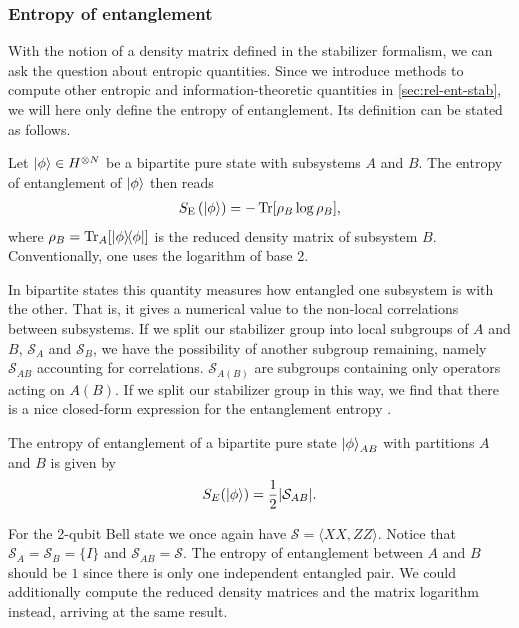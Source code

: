 \subsubsection{Entropy of entanglement}

With the notion of a density matrix defined in the stabilizer formalism, we can
ask the question about entropic quantities. Since we introduce methods to
compute other entropic and information-theoretic quantities in
\cref{sec:rel-ent-stab}, we will here only define the entropy of entanglement.
Its definition can be stated as follows.
\begin{defn}\label{defn:entent}
  Let $\ket{\phi}\in H^{\otimes N}$ be a bipartite pure state with subsystems
  $A$ and $B$. The entropy of entanglement of $\ket{\phi}$ then reads
  \begin{align}
    S_\mathrm{E}\left(\ket{\phi}\right) = - \Tr[\rho_B \log \rho_B],
  \end{align}
  where $\rho_B = \Tr_A[\dyad{\phi}]$ is the reduced density matrix of subsystem
  $B$. Conventionally, one uses the logarithm of base 2.
\end{defn}

In bipartite states this quantity measures how entangled one subsystem is with
the other. That is, it gives a numerical value to the non-local correlations between
subsystems. If we split our stabilizer group into local subgroups of $A$ and
$B$, $\mathcal{S}_A$ and $\mathcal{S}_B$, we have the possibility of another
subgroup remaining, namely $\mathcal{S}_{AB}$ accounting for correlations.
$\mathcal{S}_{A(B)}$ are subgroups containing only operators acting on $A (B)$.
If we split our stabilizer group in this way, we find that there is a nice
closed-form expression for the entanglement entropy
\cite{fattalEntanglementStabilizerFormalism2004}.

\begin{thm}\label{thm:entent}
  The entropy of entanglement of a bipartite pure state $\ket{\phi}_{AB}$ with
  partitions $A$ and $B$ is given
  by
  \begin{align}\label{eq:entent}
    S_E(\ket{\phi}) = \frac{1}{2}\abs{\mathcal{S}_{AB}}
  .\end{align}
\end{thm}
For
the 2-qubit Bell state we once again have $\mathcal{S} = \langle XX,
ZZ\rangle$. Notice that $\mathcal{S}_A = \mathcal{S}_B = \{I\}$ and $\mathcal{S}_{AB} =
\mathcal{S}$. 
The entropy of entanglement between $A$ and $B$ should be $1$
since there is only one independent entangled pair. We could additionally compute
the reduced density matrices and the matrix logarithm instead, arriving at the
same result.

